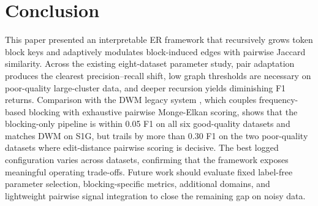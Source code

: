 \documentclass[conference]{IEEEtran}
\begin{document}
\section{Conclusion}
This paper presented an interpretable ER framework that recursively grows token block keys and adaptively modulates block-induced edges with pairwise Jaccard similarity. Across the existing eight-dataset parameter study, pair adaptation produces the clearest precision--recall shift, low graph thresholds are necessary on poor-quality large-cluster data, and deeper recursion yields diminishing F1 returns. Comparison with the DWM legacy system \cite{talburt2020}, which couples frequency-based blocking with exhaustive pairwise Monge-Elkan scoring, shows that the blocking-only pipeline is within 0.05 F1 on all six good-quality datasets and matches DWM on S1G, but trails by more than 0.30 F1 on the two poor-quality datasets where edit-distance pairwise scoring is decisive. The best logged configuration varies across datasets, confirming that the framework exposes meaningful operating trade-offs. Future work should evaluate fixed label-free parameter selection, blocking-specific metrics, additional domains, and lightweight pairwise signal integration to close the remaining gap on noisy data.



\end{document}
